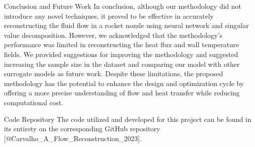\begin{frame}{Conclusion and Future Work}
\protect\hypertarget{conclusion-and-future-work}{}
In conclusion, although our methodology did not introduce any novel
techniques, it proved to be effective in accurately reconstructing the
fluid flow in a rocket nozzle using neural network and singular value
decomposition. However, we acknowledged that the methodology's
performance was limited in reconstructing the heat flux and wall
temperature fields. We provided suggestions for improving the
methodology and suggested increasing the sample size in the dataset and
comparing our model with other surrogate models as future work. Despite
these limitations, the proposed methodology has the potential to enhance
the design and optimization cycle by offering a more precise
understanding of flow and heat transfer while reducing computational
cost.
\end{frame}

\begin{frame}{Code Repository}
\protect\hypertarget{code-repository}{}
The code utilized and developed for this project can be found in its
entirety on the corresponding GitHub repository
{[}@Carvalho\_A\_Flow\_Reconstruction\_2023{]}.
\end{frame}
